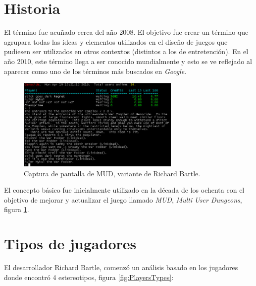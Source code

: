 \section{Historia}

El término {\gam} fue acuñado cerca del año 2008\cite{DefineGamefication}.
El objetivo fue crear un término que agrupara todas las ideas y elementos
utilizados en el diseño de juegos que pudiesen ser utilizados en otros contextos
(distintos a los de entretención).
En el año 2010, este término llega a ser conocido mundialmente  y esto se ve reflejado
 al aparecer como uno de los términos más buscados en \emph{Google}\cite{GamWorks}.

\begin{figure}[!htb]
  \centering
  \includegraphics[width=0.7\textwidth]{images/mud_SS_2.jpg}
  \caption[Captura de pantalla de juego MUD]{Captura de pantalla de MUD,
  variante de Richard Bartle.}
  \label{fig:MudClient}
\end{figure}

El concepto básico fue inicialmente utilizado en la década de los ochenta con el
objetivo de mejorar y actualizar el juego llamado \emph{MUD}, \emph{Multi User Dungeons}, 
figura \ref{fig:MudClient}.

\section{Tipos de jugadores}

El desarrollador Richard Bartle\cite{Richard}, comenzó un análisis basado en los jugadores
donde encontró 4 estereotipos, figura \ref{fig:PlayersTypes}:

